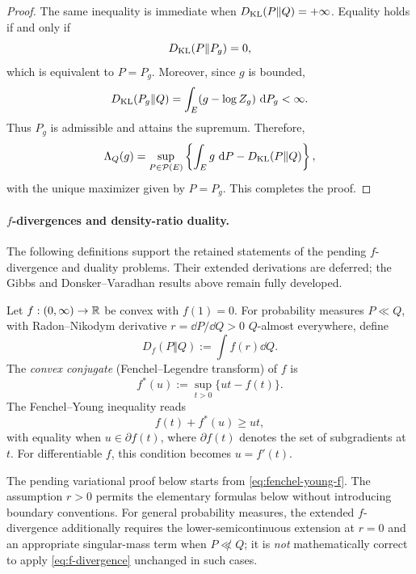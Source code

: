 \documentclass[12pt,a4paper,oneside]{book}
\begin{document}
\begin{proof}
The same inequality is immediate when $D_{\mathrm{KL}}(P\Vert Q)=+\infty$. Equality holds if and only if
\begin{equation*}
    D_{\mathrm{KL}}(P\Vert P_g)=0,
\end{equation*}
which is equivalent to $P=P_g$. Moreover, since $g$ is bounded,
\begin{equation*}
    D_{\mathrm{KL}}(P_g\Vert Q) = \int_E(g-\log Z_g)\,\,\mathrm{d} P_g <\infty.
\end{equation*}
Thus $P_g$ is admissible and attains the supremum. Therefore,
\begin{equation*}
    \Lambda_Q(g) = \sup_{P\in\mathcal P(E)}
        \left\{
            \int_E g\,\,\mathrm{d} P-D_{\mathrm{KL}}(P\Vert Q)
        \right\},
\end{equation*}
with the unique maximizer given by $P=P_g$. This completes the proof.
\end{proof}


\paragraph{$f$-divergences and density-ratio duality.}
The following definitions support the retained statements of the pending $f$-divergence and duality problems. Their extended 
derivations are deferred; the Gibbs and Donsker--Varadhan results above remain fully developed.

\begin{definition}
\label{def:f-divergence}
Let $f:(0,\infty)\to\mathbb{R}$ be convex with $f(1)=0$. For probability measures $P\ll Q$, with Radon--Nikodym derivative
$r=\dd P/\dd Q>0$ $Q$-almost everywhere, define
\begin{equation}
    D_f(P\Vert Q):=\int f(r)\dd Q.
\label{eq:f-divergence}
\end{equation}
The \emph{convex conjugate} (Fenchel--Legendre transform) of $f$ is
\begin{equation*}
    f^*(u):=\sup_{t>0}\{ut-f(t)\}.
\end{equation*}
The Fenchel--Young inequality reads
\begin{equation}
    f(t)+f^*(u)\ge ut,
    \label{eq:fenchel-young-f}
\end{equation}
with equality when $u\in\partial f(t)$, where $\partial f(t)$ denotes the set of subgradients at $t$. For differentiable $f$,
this condition becomes $u=f'(t)$.
\end{definition}

The pending variational proof below starts from \eqref{eq:fenchel-young-f}.
The assumption $r>0$ permits the elementary formulas below without
introducing boundary conventions. For general probability measures,
the extended $f$-divergence additionally requires the lower-semicontinuous
extension at $r=0$ and an appropriate singular-mass term when
$P\not\ll Q$; it is \emph{not} mathematically correct to apply
\eqref{eq:f-divergence} unchanged in such cases.
\end{document}
